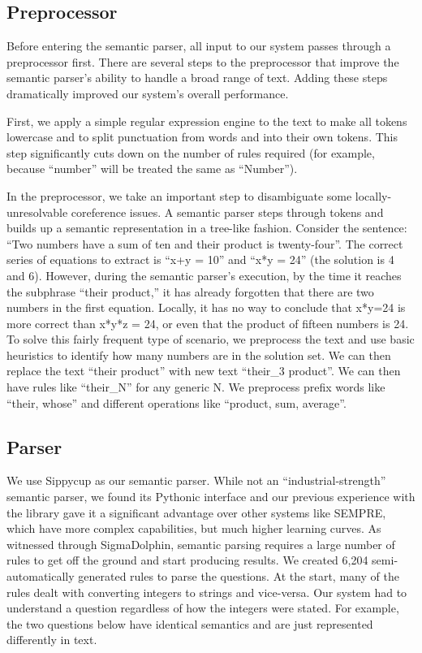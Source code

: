 \documentclass[11pt]{article}
\begin{document}
\subsection{Preprocessor}

Before entering the semantic parser, all input to our system passes through a preprocessor first. There are several steps to the preprocessor that improve the semantic parser’s ability to handle a broad range of text. Adding these steps dramatically improved our system’s overall performance.

First, we apply a simple regular expression engine to the text to make all tokens lowercase and to split punctuation from words and into their own tokens. This step significantly cuts down on the number of rules required (for example, because ``number'' will be treated the same as ``Number'').

In the preprocessor, we take an important step to disambiguate some locally-unresolvable coreference issues. A semantic parser steps through tokens and builds up a semantic representation in a tree-like fashion. Consider the sentence: ``Two numbers have a sum of ten and their product is twenty-four''. The correct series of equations to extract is ``x+y = 10'' and ``x*y = 24'' (the solution is 4 and 6). However, during the semantic parser’s execution, by the time it reaches the subphrase ``their product,'' it has already forgotten that there are two numbers in the first equation. Locally, it has no way to conclude that x*y=24 is more correct than x*y*z = 24, or even that the product of fifteen numbers is 24. To solve this fairly frequent type of scenario, we preprocess the text and use basic heuristics to identify how many numbers are in the solution set. We can then replace the text ``their product'' with new text ``their\_3 product''. We can then have rules like ``their\_N'' for any generic N. We preprocess prefix words like ``their, whose'' and different operations like ``product, sum, average''.


\subsection{Parser}

We use Sippycup as our semantic parser. While not an ``industrial-strength'' semantic parser, we found its Pythonic interface and our previous experience with the library gave it a significant advantage over other systems like SEMPRE, which have more complex capabilities, but much higher learning curves. As witnessed through SigmaDolphin, semantic parsing requires a large number of rules to get off the ground and start producing results. We created 6,204 semi-automatically generated rules to parse the questions. At the start, many of the rules dealt with converting integers to strings and vice-versa. Our system had to understand a question regardless of how the integers were stated. For example, the two questions below have identical semantics and are just represented differently in text.
\end{document}
